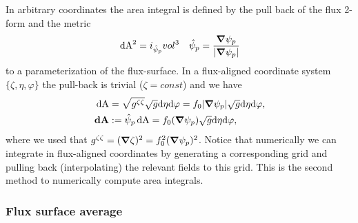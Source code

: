 In arbitrary coordinates the area integral is defined by the pull back
of the flux 2-form and the metric
\begin{align}
\label{}
\,\mathrm{dA}^2 = i_{\hat \psi_p} vol^3 \quad \hat \psi_p = \frac{{\boldsymbol{\nabla}} \psi_p}{|{\boldsymbol{\nabla}} \psi_p|}
\end{align}
to a parameterization of the flux-surface.
In a flux-aligned coordinate system $\{\zeta, \eta, \varphi\}$ the pull-back is trivial ($\zeta=const$) and we have
\begin{align}
\,\mathrm{dA} &= \sqrt{g^{\zeta\zeta}} \sqrt{g} \mathrm{d}\eta\mathrm{d}\varphi = f_0|{\boldsymbol{\nabla}}\psi_p|\sqrt{g}\mathrm{d}\eta\mathrm{d}\varphi,
\\
{\boldsymbol{\,\mathrm{dA}}} &:= \hat\psi_p \,\mathrm{dA} = f_0 ({\boldsymbol{\nabla}}\psi_p) \sqrt{g}\mathrm{d}\eta\mathrm{d}\varphi,\quad
\label{}
\end{align}
where we used that $g^{\zeta\zeta} = ({\boldsymbol{\nabla}}\zeta)^2 = f_0^2({\boldsymbol{\nabla}}\psi_p)^2$.
Notice that numerically we can integrate in flux-aligned coordinates by generating a corresponding
grid and pulling back (interpolating) the relevant fields to this grid. This is the second method
to numerically compute area integrals.

\subsubsection{Flux surface average}


